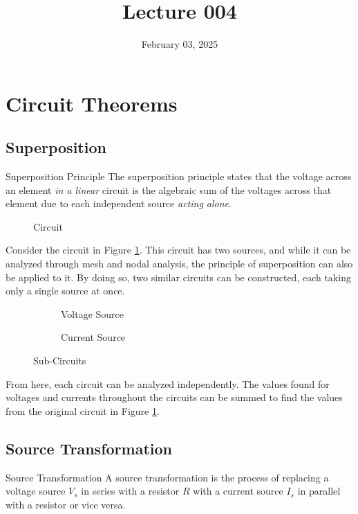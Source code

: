 \documentclass[12pt]{article}
\title{Lecture 004}
\date{February 03, 2025}
\begin{document}
\newpage
\section{Circuit Theorems}
\label{sec:circuitTheorems}

\subsection{Superposition}
\label{ssec:superposition}

\begin{definition}{Superposition Principle}
  The superposition principle states that the voltage across an element \textit{in a linear} circuit is the algebraic sum of the voltages across that element due to each independent source \textit{acting alone}.
\end{definition}

\begin{figure}[H]
  \centering
  
  \caption{Circuit}
  \label{fig:011}
\end{figure}
Consider the circuit in Figure \ref{fig:011}. This circuit has two sources, and while it can be analyzed through mesh and nodal analysis, the principle of superposition can also be applied to it. By doing so, two similar circuits can be constructed, each taking only a single source at once.
\begin{figure}[H]
  \centering
  \begin{subfigure}[H]{0.45\textwidth}
    \centering
    
    \caption{Voltage Source}
    \label{fig:012}
  \end{subfigure}
  \begin{subfigure}[H]{0.45\textwidth}
    \centering
    
    \caption{Current Source}
    \label{fig:013}
  \end{subfigure}
  \caption{Sub-Circuits}
  \label{fig:subcircuits}
\end{figure}
From here, each circuit can be analyzed independently. The values found for voltages and currents throughout the circuits can be summed to find the values from the original circuit in Figure \ref{fig:011}.

\subsection{Source Transformation}
\label{ssec:sourceTransformation}

\begin{definition}{Source Transformation}
  A source transformation is the process of replacing a voltage source $V_s$ in series with a resistor $R$ with a current source $I_s$ in parallel with a resistor or vice versa.
\end{definition}
\end{document}

